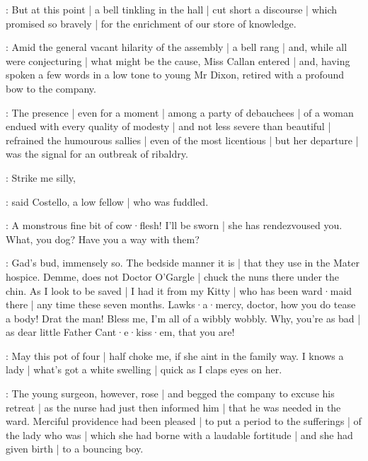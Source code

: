 :
But at this point |
a bell tinkling in the hall
 |
cut short a discourse |
which promised so bravely |
for the enrichment of our store of knowledge.



:
Amid the general vacant hilarity of the assembly |
a bell rang 
 |
and,
while all were conjecturing |
what might be the cause,
Miss Callan entered |
and,
having spoken a few words in a low tone to young Mr Dixon,
retired with a profound bow to the company.

:
The presence |
even for a moment |
among a party of debauchees |
of a woman endued with every quality of modesty |
and not less severe than beautiful |
refrained the humourous sallies |
even of the most licentious |
but her departure |
was the signal for an outbreak of ribaldry.

\punch:
Strike me silly,

:
said Costello,
a low fellow |
who was fuddled.

\punch:
A monstrous fine bit of cow·flesh!
I'll be sworn |
she has rendezvoused you.
What,
you dog?
Have you a way with them?

\lynch:
Gad's bud,
immensely so.
The bedside manner it is |
that they use in the Mater hospice.
Demme,
does not Doctor O'Gargle |
chuck the nuns there under the chin.
As I look to be saved |
I had it from my Kitty |
who has been ward·maid there |
any time these seven months.
Lawks·a·mercy,
doctor,
how you do tease a body!
Drat the man!
Bless me,
I'm all of a wibbly
wobbly.
Why,
you're as bad |
as dear little Father Cant·e·kiss·em,
that you are!

\punch:
May this pot of four |
half choke me,
if she aint in the family way.
I knows a lady |
what's got a white swelling |
quick as I claps eyes on her.

:
The young surgeon,
however,
rose |
and begged the company to excuse his retreat |
as the nurse had just then informed him |
that he was needed in the ward.
Merciful providence had been pleased |
to put a period to the sufferings |
of the lady who was  |
which she had borne with a laudable fortitude |
and she had given birth |
to a bouncing boy.

